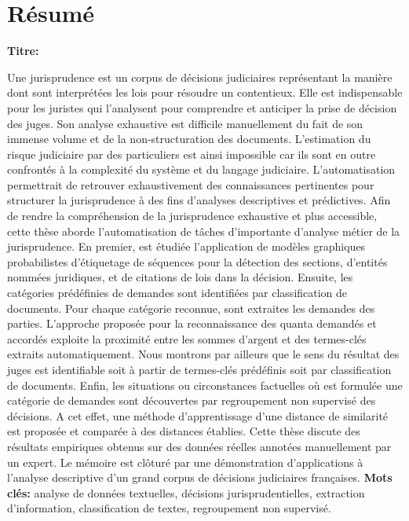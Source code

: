 \chapter*{Résumé}
\textbf{Titre:} \textsc{\titlefr}

Une jurisprudence est un corpus de décisions judiciaires représentant la manière dont sont interprétées les lois pour résoudre un contentieux. Elle est indispensable pour les juristes qui l'analysent pour comprendre et anticiper la prise de décision des juges. Son analyse exhaustive est difficile manuellement du fait de son immense volume et de la non-structuration des documents. L'estimation du risque judiciaire par des particuliers est ainsi impossible car ils sont en outre confrontés à la complexité du système et du langage judiciaire. L'automatisation permettrait de retrouver exhaustivement des connaissances pertinentes pour structurer la jurisprudence à des fins d'analyses descriptives et prédictives.  
Afin de rendre la compréhension de la jurisprudence exhaustive et plus accessible, cette thèse aborde l'automatisation de tâches d'importante  d'analyse métier de la jurisprudence. En premier, est étudiée l'application de modèles graphiques probabilistes d'étiquetage de séquences pour la détection des sections, d'entités nommées juridiques, et de citations de lois dans la décision. Ensuite, les catégories prédéfinies de demandes sont identifiées par classification de documents. Pour chaque catégorie reconnue, sont extraites les demandes des parties.  L'approche proposée pour la reconnaissance des quanta demandés et accordés exploite la proximité entre les sommes d'argent et des termes-clés extraits automatiquement. Nous montrons par ailleurs que le sens du résultat des juges est identifiable soit à partir de termes-clés prédéfinis soit par classification de documents. Enfin, les situations ou circonstances factuelles où est formulée une catégorie de demandes sont découvertes par regroupement non supervisé des décisions. A cet effet, une méthode d'apprentissage d'une distance de similarité est proposée et comparée à des distances établies.
Cette thèse discute des résultats empiriques obtenus sur des données réelles annotées manuellement par un expert. Le mémoire est clôturé par une démonstration d'applications à l'analyse descriptive d'un grand corpus de décisions judiciaires françaises.
\newline
\textbf{Mots clés:} analyse de données textuelles, décisions jurisprudentielles, extraction d'information, classification de textes, regroupement non supervisé.

